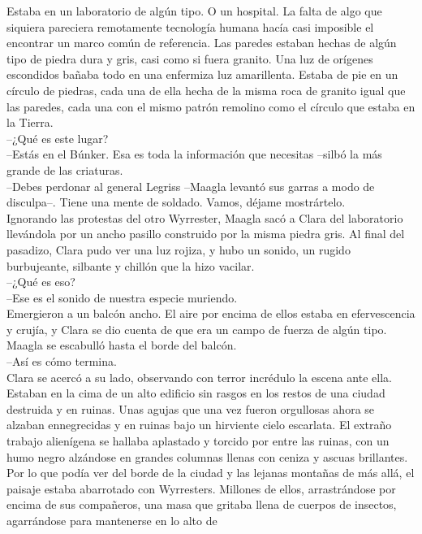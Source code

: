Estaba en un laboratorio de algún tipo. O un hospital. La falta de algo
que siquiera pareciera remotamente tecnología humana hacía casi
imposible el encontrar un marco común de referencia. Las paredes estaban
hechas de algún tipo de piedra dura y gris, casi como si fuera granito.
Una luz de orígenes escondidos bañaba todo en una enfermiza luz
amarillenta. Estaba de pie en un círculo de piedras, cada una de ella
hecha de la misma roca de granito igual que las paredes, cada una con el
mismo patrón remolino como el círculo que estaba en la Tierra.\\
--¿Qué es este lugar?\\
--Estás en el Búnker. Esa es toda la información que necesitas --silbó
la más grande de las criaturas.\\
--Debes perdonar al general Legriss --Maagla levantó sus garras a modo
de disculpa--. Tiene una mente de soldado. Vamos, déjame mostrártelo.\\
Ignorando las protestas del otro Wyrrester, Maagla sacó a Clara del
laboratorio llevándola por un ancho pasillo construido por la misma
piedra gris. Al final del pasadizo, Clara pudo ver una luz rojiza, y
hubo un sonido, un rugido burbujeante, silbante y chillón que la hizo
vacilar.\\
--¿Qué es eso?\\
--Ese es el sonido de nuestra especie muriendo.\\
Emergieron a un balcón ancho. El aire por encima de ellos estaba en
efervescencia y crujía, y Clara se dio cuenta de que era un campo de
fuerza de algún tipo. Maagla se escabulló hasta el borde del balcón.\\
--Así es cómo termina.\\
Clara se acercó a su lado, observando con terror incrédulo la escena
ante ella.\\
Estaban en la cima de un alto edificio sin rasgos en los restos de una
ciudad destruida y en ruinas. Unas agujas que una vez fueron orgullosas
ahora se alzaban ennegrecidas y en ruinas bajo un hirviente cielo
escarlata. El extraño trabajo alienígena se hallaba aplastado y torcido
por entre las ruinas, con un humo negro alzándose en grandes columnas
llenas con ceniza y ascuas brillantes.\\
Por lo que podía ver del borde de la ciudad y las lejanas montañas de
más allá, el paisaje estaba abarrotado con Wyrresters. Millones de
ellos, arrastrándose por encima de sus compañeros, una masa que gritaba
llena de cuerpos de insectos, agarrándose para mantenerse en lo alto de
